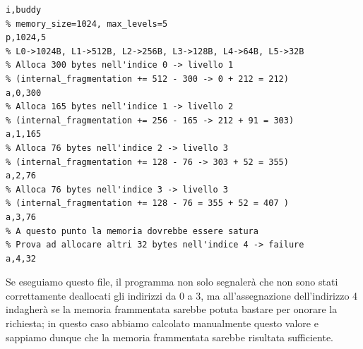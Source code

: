 \begin{lstlisting}[language={}]
% Benchmark per allocatore variabile
i,buddy
% memory_size=1024, max_levels=5
p,1024,5       
% L0->1024B, L1->512B, L2->256B, L3->128B, L4->64B, L5->32B
% Alloca 300 bytes nell'indice 0 -> livello 1
% (internal_fragmentation += 512 - 300 -> 0 + 212 = 212)
a,0,300        
% Alloca 165 bytes nell'indice 1 -> livello 2
% (internal_fragmentation += 256 - 165 -> 212 + 91 = 303)
a,1,165        
% Alloca 76 bytes nell'indice 2 -> livello 3
% (internal_fragmentation += 128 - 76 -> 303 + 52 = 355)
a,2,76        
% Alloca 76 bytes nell'indice 3 -> livello 3
% (internal_fragmentation += 128 - 76 = 355 + 52 = 407 )
a,3,76         
% A questo punto la memoria dovrebbe essere satura
% Prova ad allocare altri 32 bytes nell'indice 4 -> failure
a,4,32         
\end{lstlisting}        

Se eseguiamo questo file, il programma non solo segnalerà che non sono stati correttamente deallocati gli indirizzi da 0 a 3, ma all'assegnazione dell'indirizzo 4 indagherà se la memoria frammentata sarebbe potuta bastare per onorare la richiesta; in questo caso abbiamo calcolato manualmente questo valore e sappiamo dunque che la memoria frammentata sarebbe risultata sufficiente. 





